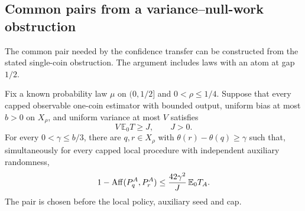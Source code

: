 \clearpage
\subsection{Common pairs from a variance--null-work obstruction}
\label{sec:common-pair-confidence}

The common pair needed by the confidence transfer can be
constructed from the stated single-coin obstruction. The argument
includes laws with an atom at gap $1/2$.

\begin{theorem}
\label{thm:common-pair-verified}
Fix a known probability law $\mu$ on $(0,1/2]$ and $0<\rho\le1/4$.
Suppose that every capped observable one-coin estimator with bounded
output, uniform bias at most $b>0$ on $X_\rho$, and uniform variance at
most $V$ satisfies
\[
 V\,\mathbb E_0T\ge J,\qquad J>0.
\]
For every $0<\gamma\le b/3$, there are $q,r\in X_\rho$ with
$\theta(r)-\theta(q)\ge\gamma$ such that, simultaneously for every
capped local procedure with independent auxiliary randomness,
\[
 1-\operatorname{Aff}(P_q^A,P_r^A)\le
 \frac{42\gamma^2}{J}\,\mathbb E_0T_A.
\]
The pair is chosen before the local policy, auxiliary seed and cap.
\end{theorem}

